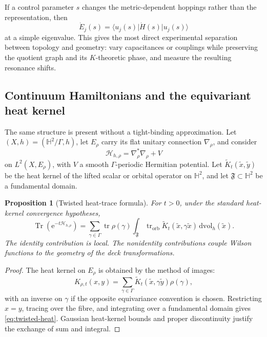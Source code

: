\documentclass[11pt]{article}
\newtheorem{proposition}[theorem]{Proposition}
\theoremstyle{definition}
\theoremstyle{remark}
\newcommand{\HH}{\mathbb H}
\newcommand{\Tr}{\operatorname{Tr}}
\newcommand{\tr}{\operatorname{tr}}
\newcommand{\cH}{\mathcal H}
\newcommand{\dd}{\mathrm d}
\newcommand{\e}{\mathrm e}
\newcommand{\ket}[1]{\lvert #1\rangle}
\newcommand{\bra}[1]{\langle #1\rvert}
\begin{document}
If a control parameter \(s\) changes the metric-dependent hoppings rather
than the representation, then
\[
    \dot E_j(s)=\bra{u_j(s)}\dot H(s)\ket{u_j(s)}
    \tag{4.12}\label{eq:metric-fh}
\]
at a simple eigenvalue.  This gives the most direct experimental separation
between topology and geometry: vary capacitances or couplings while preserving
the quotient graph and its \(K\)-theoretic phase, and measure the resulting
resonance shifts.

\subsection{Continuum Hamiltonians and the equivariant heat kernel}

The same structure is present without a tight-binding approximation.  Let
\((X,h)=(\HH^2/\Gamma,h)\), let \(E_\rho\) carry its flat unitary connection
\(\nabla_\rho\), and consider
\[
       \cH_{h,\rho}
        =\nabla_\rho^*\nabla_\rho+V
        \tag{4.13}\label{eq:continuum-H}
\]
on \(L^2(X,E_\rho)\), with \(V\) a smooth \(\Gamma\)-periodic Hermitian
potential.  Let \(\widetilde K_t(\widetilde x,\widetilde y)\) be the heat
kernel of the lifted scalar or orbital operator on \(\HH^2\), and let
\(\mathfrak F\subset\HH^2\) be a fundamental domain.

\begin{proposition}[Twisted heat-trace formula]
\label{prop:heat-trace}
For \(t>0\), under the standard heat-kernel convergence hypotheses,
\[
 \Tr\!\left(\e^{-t\cH_{h,\rho}}\right)
 =
 \sum_{\gamma\in\Gamma}
   \tr\rho(\gamma)
   \int_{\mathfrak F}
      \tr_{\mathrm{orb}}
      \widetilde K_t(\widetilde x,\gamma\widetilde x)
      \,\dd\mathrm{vol}_h(\widetilde x).
 \tag{4.14}\label{eq:twisted-heat}
\]
The identity contribution is local.  The nonidentity contributions couple
Wilson functions to the geometry of the deck transformations.
\end{proposition}

\begin{proof}
The heat kernel on \(E_\rho\) is obtained by the method of images:
\[
 K_{\rho,t}(x,y)
   =\sum_{\gamma\in\Gamma}
      \widetilde K_t(\widetilde x,\gamma\widetilde y)\rho(\gamma),
 \]
with an inverse on \(\gamma\) if the opposite equivariance convention is
chosen.  Restricting \(x=y\), tracing over the fibre, and integrating over a
fundamental domain gives \eqref{eq:twisted-heat}.  Gaussian heat-kernel bounds
and proper discontinuity justify the exchange of sum and integral.
\end{proof}
\end{document}
